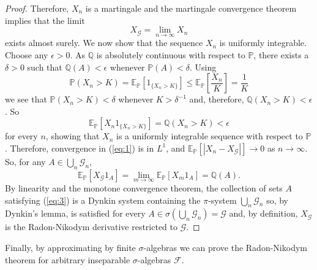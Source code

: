 \documentclass[12pt]{article}
\begin{document}
\begin{proof}
Therefore, $X_n$ is a martingale and the martingale convergence theorem implies that the limit
\begin{equation}\label{eq:1}
X_\mathcal{G}=\lim_{n\rightarrow\infty}X_n
\end{equation}
exists almost surely. We now show that the sequence $X_n$ is uniformly integrable. Choose any $\epsilon>0$. As $\mathbb{Q}$ is absolutely continuous with respect to $\mathbb{P}$, there exists a $\delta>0$ such that $\mathbb{Q}(A)<\epsilon$ whenever $\mathbb{P}(A)<\delta$. Using
\begin{equation*}
\mathbb{P}(X_n>K)=\mathbb{E}_{\mathbb{P}}[1_{\{X_n>K\}}]\le\mathbb{E}_\mathbb{P}\left[\frac{X_n}{K}\right]=\frac{1}{K}
\end{equation*}
we see that $\mathbb{P}(X_n>K)<\delta$ whenever $K>\delta^{-1}$ and, therefore, $\mathbb{Q}(X_n>K)<\epsilon$. So
\begin{equation*}
\mathbb{E}_{\mathbb{P}}[X_n1_{\{X_n>K\}}]=\mathbb{Q}(X_n>K)<\epsilon
\end{equation*}
for every $n$, showing that $X_n$ is a uniformly integrable sequence with respect to $\mathbb{P}$.
Therefore, convergence in (\ref{eq:1}) is in $L^1$, and $\mathbb{E}_{\mathbb{P}}[|X_n-X_\mathcal{G}|]\rightarrow 0$ as $n\rightarrow\infty$. So, for any $A\in\bigcup_n\mathcal{G}_n$,
\begin{equation}\label{eq:3}
\mathbb{E}_\mathbb{P}[X_\mathcal{G}1_A]=\lim_{m\rightarrow\infty}\mathbb{E}_\mathbb{P}[X_m1_A]=\mathbb{Q}(A).
\end{equation}
By linearity and the monotone convergence theorem, the collection of sets $A$ satisfying (\ref{eq:3}) is a Dynkin system containing the $\pi$-system $\bigcup_n\mathcal{G}_n$ so, by Dynkin's lemma, is satisfied for every $A\in\sigma(\bigcup_n\mathcal{G}_n)=\mathcal{G}$ and, by definition, $X_\mathcal{G}$ is the Radon-Nikodym derivative restricted to $\mathcal{G}$.
\end{proof}

Finally, by approximating by finite $\sigma$-algebras we can prove the Radon-Nikodym theorem for arbitrary inseparable $\sigma$-algebras $\mathcal{F}$.

\

\end{document}
